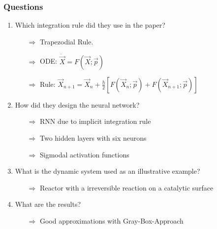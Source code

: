 \begin{frame}
	\frametitle{Questions}
	\begin{enumerate}
		\item Which integration rule did they use in the paper?
		\begin{itemize}
			\item[$\Rightarrow$] Trapezodial Rule.\vspace{1mm}
			\item[$\Rightarrow$] ODE: $\dot{\overrightarrow{X}} = F(\overrightarrow{X}; \overrightarrow{p})$\vspace{1mm}
			\item[$\Rightarrow$] Rule: $\overrightarrow{X}_{n+1} = \overrightarrow{X}_n + \frac{h}{2}[F(\overrightarrow{X}_n; \overrightarrow{p}) + F(\overrightarrow{X}_{n+1}; \overrightarrow{p})]$
		\end{itemize}
		\item How did they design the neural network?
		\begin{itemize}
			\item[$\Rightarrow$] RNN due to implicit integration rule
			\item[$\Rightarrow$] Two hidden layers with six neurons
			\item[$\Rightarrow$] Sigmodal activation functions
		\end{itemize}
		\item What is the dynamic system used as an illustrative example?
		\begin{itemize}
			\item[$\Rightarrow$] Reactor with a irreversible reaction on a catalytic surface
		\end{itemize}
		\item What are the results?
		\begin{itemize}
			\item[$\Rightarrow$] Good approximations with Gray-Box-Approach
		\end{itemize}
	\end{enumerate}
\end{frame}
